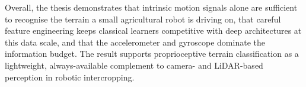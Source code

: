 Overall, the thesis demonstrates that intrinsic motion signals alone are sufficient to recognise the terrain a small agricultural robot is driving on, that careful feature engineering keeps classical learners competitive with deep architectures at this data scale, and that the accelerometer and gyroscope dominate the information budget. The result supports proprioceptive terrain classification as a lightweight, always-available complement to camera- and LiDAR-based perception in robotic intercropping.